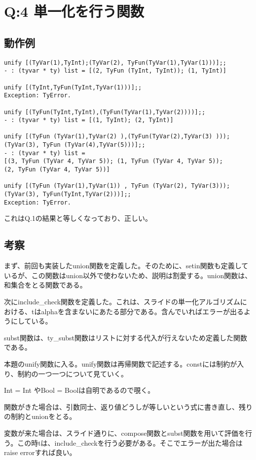 \documentclass[uplatex,12pt]{jsarticle}
\begin{document}
\section{Q:4 単一化を行う関数}

\subsection{動作例}
\begin{lstlisting}[caption=動作例]
unify [(TyVar(1),TyInt);(TyVar(2), TyFun(TyVar(1),TyVar(1)))];;
- : (tyvar * ty) list = [(2, TyFun (TyInt, TyInt)); (1, TyInt)]

unify [(TyInt,TyFun(TyInt,TyVar(1)))];;
Exception: TyError.

unify [(TyFun(TyInt,TyInt),(TyFun(TyVar(1),TyVar(2))))];;
- : (tyvar * ty) list = [(1, TyInt); (2, TyInt)]

unify [(TyFun (TyVar(1),TyVar(2) ),(TyFun(TyVar(2),TyVar(3) )));
(TyVar(3), TyFun (TyVar(4),TyVar(5)))];;
- : (tyvar * ty) list =
[(3, TyFun (TyVar 4, TyVar 5)); (1, TyFun (TyVar 4, TyVar 5));
(2, TyFun (TyVar 4, TyVar 5))]

unify [(TyFun (TyVar(1),TyVar(1)) , TyFun (TyVar(2), TyVar(3)));
(TyVar(3), TyFun(TyInt,TyVar(2)))];;
Exception: TyError.
\end{lstlisting}

これはQ.1の結果と等しくなっており、正しい。

\subsection{考察}
まず、前回も実装したunion関数を定義した。そのために、setin関数も定義しているが、この関数はunion以外で使わないため、説明は割愛する。union関数は、和集合をとる関数である。

次にinclude\_check関数を定義した。これは、スライドの単一化アルゴリズムにおける、tはalphaを含まないにあたる部分である。含んでいればエラーが出るようにしている。

subst関数は、ty\_subst関数はリストに対する代入が行えないため定義した関数である。

本題のunify関数に入る。unify関数は再帰関数で記述する。constには制約が入り、制約の一つ一つについて見ていく。

Int = Int やBool = Boolは自明であるので覗く。

関数がきた場合は、引数同士、返り値どうしが等しいという式に書き直し、残りの制約とunionをとる。

変数が来た場合は、スライド通りに、compose関数とsubst関数を用いて評価を行う。この時tは、include\_checkを行う必要がある。そこでエラーが出た場合はraise errorすれば良い。
\end{document}
